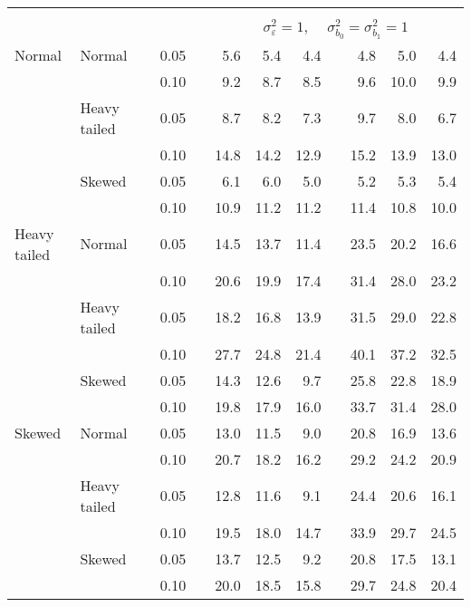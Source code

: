 \begin{table}[ht]
\begin{scriptsize}
\begin{center}
\begin{tabular}{ll p{.1cm} c p{.1cm} rrr p{.1cm} rrr}
&&&&&&&&&&&\\
& && && \multicolumn{7}{c}{$\sigma_{\varepsilon}^2 = 1$, \ \ $\sigma_{b_0}^2 = \sigma_{b_1}^2 = 1$} \\ \cline{6-12}
Normal       & Normal       && 0.05 &&   5.6 & 5.4 & 4.4 &   & 4.8 & 5.0 & 4.4 \\ 
             &              && 0.10 &&   9.2 & 8.7 & 8.5 &   & 9.6 & 10.0 & 9.9 \\ 
             & Heavy tailed && 0.05 &&   8.7 & 8.2 & 7.3 &   & 9.7 & 8.0 & 6.7 \\ 
             &              && 0.10 &&   14.8 & 14.2 & 12.9 &   & 15.2 & 13.9 & 13.0 \\ 
             & Skewed       && 0.05 &&   6.1 & 6.0 & 5.0 &   & 5.2 & 5.3 & 5.4 \\ 
             &              && 0.10 &&   10.9 & 11.2 & 11.2 &   & 11.4 & 10.8 & 10.0 \\ 
Heavy tailed & Normal       && 0.05 &&   14.5 & 13.7 & 11.4 &   & 23.5 & 20.2 & 16.6 \\ 
             &              && 0.10 &&   20.6 & 19.9 & 17.4 &   & 31.4 & 28.0 & 23.2 \\ 
             & Heavy tailed && 0.05 &&   18.2 & 16.8 & 13.9 &   & 31.5 & 29.0 & 22.8 \\ 
             &              && 0.10 &&   27.7 & 24.8 & 21.4 &   & 40.1 & 37.2 & 32.5 \\ 
             & Skewed       && 0.05 &&   14.3 & 12.6 & 9.7 &   & 25.8 & 22.8 & 18.9 \\ 
             &              && 0.10 &&   19.8 & 17.9 & 16.0 &   & 33.7 & 31.4 & 28.0 \\ 
Skewed       & Normal       && 0.05 &&   13.0 & 11.5 & 9.0 &   & 20.8 & 16.9 & 13.6 \\ 
             &              && 0.10 &&   20.7 & 18.2 & 16.2 &   & 29.2 & 24.2 & 20.9 \\ 
             & Heavy tailed && 0.05 &&   12.8 & 11.6 & 9.1 &   & 24.4 & 20.6 & 16.1 \\ 
             &              && 0.10 &&   19.5 & 18.0 & 14.7 &   & 33.9 & 29.7 & 24.5 \\ 
             & Skewed       && 0.05 &&   13.7 & 12.5 & 9.2 &   & 20.8 & 17.5 & 13.1 \\ 
             &              && 0.10 &&   20.0 & 18.5 & 15.8 &   & 29.7 & 24.8 & 20.4 \\ 


\end{tabular}
\end{center}
\end{scriptsize}
\end{table}
